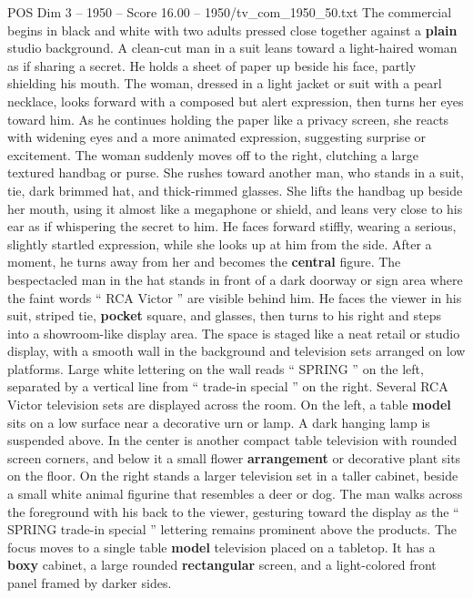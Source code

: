 \begin{textsample}{POS Dim 3 – 1950 – Score 16.00 – 1950/tv\_com\_1950\_50.txt}  \label{ex:f3_pos_006}
The commercial begins in black and white with two adults pressed close together against a \textbf{plain} studio background.
A clean-cut man in a suit leans toward a light-haired woman as if sharing a secret.
He holds a sheet of paper up beside his face, partly shielding his mouth.
The woman, dressed in a light jacket or suit with a pearl necklace, looks forward with a composed but alert expression, then turns her eyes toward him.
As he continues holding the paper like a privacy screen, she reacts with widening eyes and a more animated expression, suggesting surprise or excitement.
The woman suddenly moves off to the right, clutching a large textured handbag or purse.
She rushes toward another man, who stands in a suit, tie, dark brimmed hat, and thick-rimmed glasses.
She lifts the handbag up beside her mouth, using it almost like a megaphone or shield, and leans very close to his ear as if whispering the secret to him.
He faces forward stiffly, wearing a serious, slightly startled expression, while she looks up at him from the side.
After a moment, he turns away from her and becomes the \textbf{central} figure.
The bespectacled man in the hat stands in front of a dark doorway or sign area where the faint words “ RCA Victor ” are visible behind him.
He faces the viewer in his suit, striped tie, \textbf{pocket} square, and glasses, then turns to his right and steps into a showroom-like display area.
The space is staged like a neat retail or studio display, with a smooth wall in the background and television sets arranged on low platforms.
Large white lettering on the wall reads “ SPRING ” on the left, separated by a vertical line from “ trade-in special ” on the right.
Several RCA Victor television sets are displayed across the room.
On the left, a table \textbf{model} sits on a low surface near a decorative urn or lamp.
A dark hanging lamp is suspended above.
In the center is another compact table television with rounded screen corners, and below it a small flower \textbf{arrangement} or decorative plant sits on the floor.
On the right stands a larger television set in a taller cabinet, beside a small white animal figurine that resembles a deer or dog.
The man walks across the foreground with his back to the viewer, gesturing toward the display as the “ SPRING trade-in special ” lettering remains prominent above the products.
The focus moves to a single table \textbf{model} television placed on a tabletop.
It has a \textbf{boxy} cabinet, a large rounded \textbf{rectangular} screen, and a light-colored front panel framed by darker sides.

\end{textsample}
